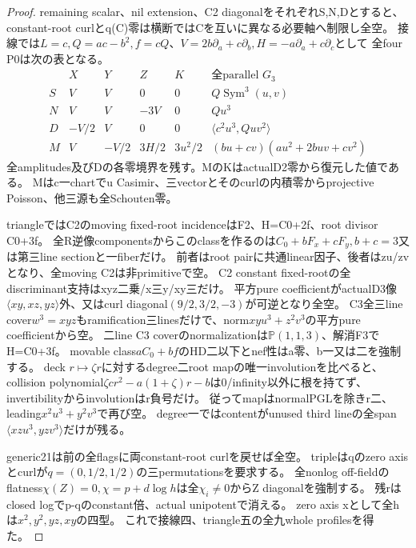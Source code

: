 \documentclass[a4paper,11pt]{ltjsarticle}
\theoremstyle{definition}
\begin{document}
\begin{proof}
remaining scalar、nil extension、C2 diagonalをそれぞれS,N,Dとすると、
constant-root curlとq(C)零は横断ではCを互いに異なる必要軸へ制限し全空。
接線では$L=c,Q=ac-b^2,f=cQ$、$V=2b\partial_a+c\partial_b,H=-a\partial_a+c\partial_c$として
全four P0は次の表となる。
\[
\begin{array}{c|c|c|c|c|c}
 &X&Y&Z&K&\text{全parallel }G_3\\\hline
 S&V&V&0&0&Q\operatorname{Sym}^3(u,v)\\
 N&V&V&-3V&0&Q u^3\\
 D&-V/2&V&0&0&\langle c^2u^3,Q uv^2\rangle\\
 M&V&-V/2&3H/2&3u^2/2&(bu+cv)(au^2+2buv+cv^2)
\end{array}
\]
全amplitudes及びDの各零境界を残す。MのKはactualD2零から復元した値である。
Mはc一chartでu Casimir、三vectorとそのcurlの内積零からprojective Poisson、他三源も全Schouten零。

triangleではC2のmoving fixed-root incidenceはF2、H=C0+2f、root divisor C0+3f。
全R逆像componentsからこのclassを作るのは$C_0+bF_x+cF_y,b+c=3$又は第三line sectionと一fiberだけ。
前者はroot pairに共通linear因子、後者はzu/zvとなり、全moving C2は非primitiveで空。
C2 constant fixed-rootの全discriminant支持はxyz二乗/x三y/xy三だけ。
平方pure coefficientがactualD3像$\langle xy,xz,yz\rangle$外、又はcurl diagonal$(9/2,3/2,-3)$が可逆となり全空。
C3全三line cover$w^3=xyz$もramification三linesだけで、norm$xyu^3+z^2v^3$の平方pure coefficientから空。
二line C3 coverのnormalizationは$\mathbb P(1,1,3)$、解消F3でH=C0+3f。
movable class$aC_0+bf$のHD二以下とnef性はa零、b一又は二を強制する。
deck $r\mapsto\zeta r$に対するdegree二root mapの唯一involutionを比べると、
collision polynomial$\zeta cr^2-a(1+\zeta)r-b$は0/infinity以外に根を持てず、invertibilityからinvolutionはr負号だけ。
従ってmapはnormalPGLを除きr二、leading$x^2u^3+y^2v^3$で再び空。
degree一ではcontentがunused third lineの全span$\langle xzu^3,yzv^3\rangle$だけが残る。

generic21は前の全flagsに両constant-root curlを戻せば全空。
tripleはqのzero axisとcurlが$q=(0,1/2,1/2)$の三permutationsを要求する。
全nonlog off-fieldのflatness$\chi(Z)=0,\chi=p+d\log h$は全$\chi_i\ne0$からZ diagonalを強制する。
残rはclosed logでp-qのconstant倍、actual unipotentで消える。
zero axis xとして全hは$x^2,y^2,yz,xy$の四型。
これで接線四、triangle五の全九whole profilesを得た。


\end{proof}
\end{document}
